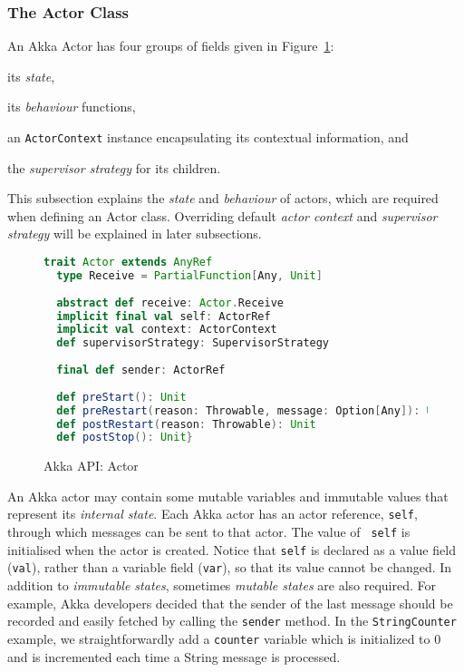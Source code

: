 \subsubsection{The Actor Class}
\label{akka_actor_class}

An Akka Actor has four groups of fields given in Figure~\ref{akka_actor_api}:
\begin{inparaenum}
\item its {\it state}, 
\item its {\it behaviour} functions, 
\item an {\tt ActorContext} instance encapsulating its contextual information,  and
\item the {\it supervisor strategy} for its children. 
\end{inparaenum}
This subsection explains the {\it state} and {\it behaviour} of actors, which 
are required when defining an Actor class.  Overriding default {\it actor 
context} and {\it supervisor strategy} will be explained in later subsections.

\begin{figure}[h]
\begin{lstlisting}[language=scala]
trait Actor extends AnyRef
  type Receive = PartialFunction[Any, Unit]
  
  abstract def receive: Actor.Receive
  implicit final val self: ActorRef  
  implicit val context: ActorContext
  def supervisorStrategy: SupervisorStrategy
  
  final def sender: ActorRef
  
  def preStart(): Unit
  def preRestart(reason: Throwable, message: Option[Any]): Unit
  def postRestart(reason: Throwable): Unit  
  def postStop(): Unit}
\end{lstlisting}
\caption{Akka API: Actor}
\label{akka_actor_api}
\end{figure}

An Akka actor may contain some mutable variables and immutable values that 
represent its {\it internal state}.  Each Akka actor has an actor reference, 
{\tt self}, through which messages can be sent to that actor.  The value of 
{\tt 
self} is initialised when the actor is created. Notice that {\tt self} is 
declared as a value field ({\tt val}), rather than a variable field 
({\tt var}), so that its value cannot be changed.  In addition to {\it 
immutable 
states}, sometimes {\it mutable states} are also required.  For example, Akka 
developers decided that the sender of the last message should be recorded and 
easily fetched by calling the {\tt sender} method.  In the {\tt StringCounter} 
example, we straightforwardly add a {\tt counter} variable which is initialized 
to 0 and is incremented each time a String message is processed.

